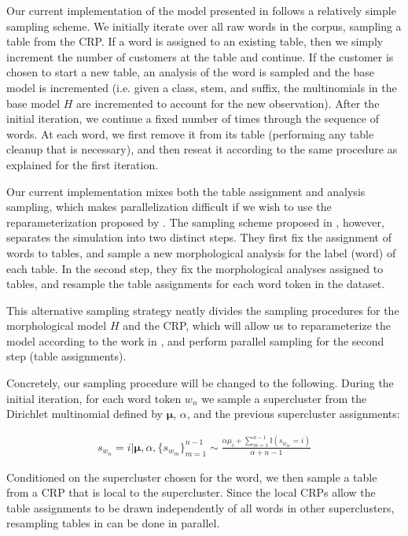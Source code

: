 \documentclass{article}
\begin{document}
Our current implementation of the model presented in
\cite{goldwater2011} follows a relatively simple sampling scheme. We
initially iterate over all raw words in the corpus, sampling a table
from the CRP. If a word is assigned to an existing table, then we
simply increment the number of customers at the table and continue. If
the customer is chosen to start a new table, an analysis of the word
is sampled and the base model is incremented (i.e. given a class,
stem, and suffix, the multinomials in the base model $H$ are
incremented to account for the new observation). After the initial
iteration, we continue a fixed number of times through the sequence of
words. At each word, we first remove it from its table (performing any
table cleanup that is necessary), and then reseat it according to the
same procedure as explained for the first iteration.

Our current implementation mixes both the table assignment and
analysis sampling, which makes parallelization difficult if we wish to
use the reparameterization proposed by \cite{lovell2012}. The sampling
scheme proposed in \cite{goldwater2011}, however, separates the
simulation into two distinct steps. They first fix the assignment of
words to tables, and sample a new morphological analysis for the label
(word) of each table. In the second step, they fix the morphological
analyses assigned to tables, and resample the table assignments for
each word token in the dataset.

This alternative sampling strategy neatly divides the sampling
procedures for the morphological model $H$ and the CRP, which will
allow us to reparameterize the model according to the work in
\cite{lovell2012}, and perform parallel sampling for the second step
(table assignments).

Concretely, our sampling procedure will be changed to the
following. During the initial iteration, for each word token $w_n$ we
sample a supercluster from the Dirichlet multinomial defined by
$\boldsymbol{\mu}$, $\alpha$, and the previous supercluster
assignments:

\begin{align}
  s_{w_n} = i | \boldsymbol{\mu}, \alpha, \{s_{w_m}\}_{m=1}^{n-1} \sim
  \frac{\alpha \mu_i + \sum_{m=1}^{n-1} \mathbb{I}(s_{w_m} = i)}{\alpha + n - 1}
\end{align}

Conditioned on the supercluster chosen for the word, we then sample a
table from a CRP that is local to the supercluster. Since the local
CRPs allow the table assignments to be drawn independently of all
words in other superclusters, resampling tables in can be done in
parallel.
\end{document}
